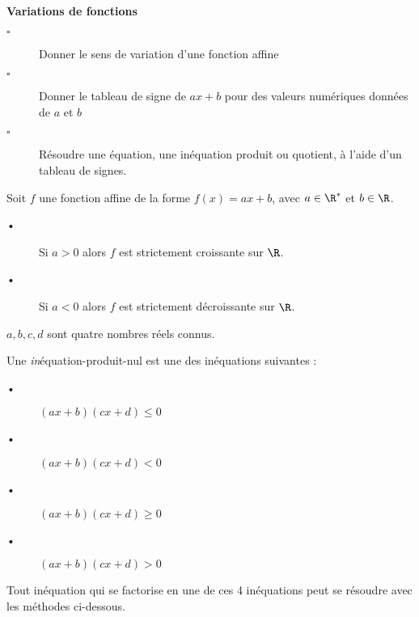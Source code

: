 \begin{titre}

\end{titre}


\begin{CpsCol}
\textbf{Variations de fonctions}
\begin{description}
\item[$\square$] Donner le sens de variation d'une fonction affine
\item[$\square$] Donner le tableau de signe de $ax + b$ pour des valeurs numériques données de $a$ et $b$
\item[$\square$] Résoudre une équation, une inéquation produit ou quotient, à l'aide d'un tableau de signes.
\end{description}
\end{CpsCol}



\begin{Pp}
Soit $f$ une fonction affine de la forme $f(x)=ax+b$, avec $a\in \R^*$ et $b \in \R$.
\begin{description}
\item[•] Si $a >0$ alors $f$ est strictement croissante sur $\R$.
\item[•] Si $a <0$ alors $f$ est strictement décroissante sur $\R$.
\end{description} 
\end{Pp}

\ROC



\begin{Def}
$a, b, c, d$ sont quatre nombres réels connus.

Une \textit{in}équation-produit-nul est une des inéquations suivantes :
\begin{description}
\item[•] $(ax+b)(cx+d) \leq  0$
\item[•] $(ax+b)(cx+d) < 0$
\item[•] $(ax+b)(cx+d) \geq 0$
\item[•] $(ax+b)(cx+d) > 0$
\end{description}
\end{Def}

\begin{Rq}
Tout inéquation qui se factorise en une de ces 4 inéquations peut se résoudre avec les méthodes ci-dessous. 
\end{Rq}


